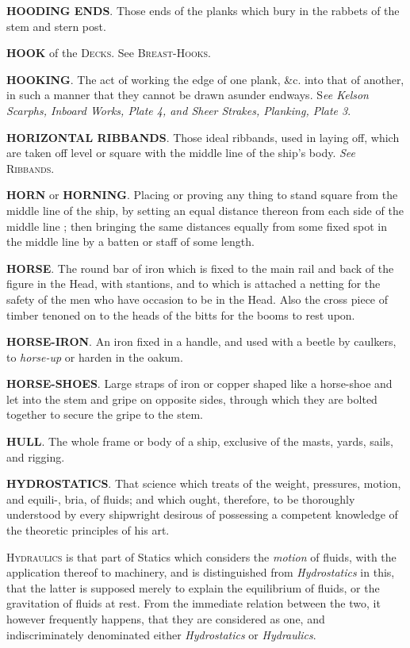 \textbf{HOODING ENDS}. Those ends of the planks which bury in the rabbets of the stem and stern post. 

\textbf{HOOK} of the \textsc{Decks}. See \textsc{Breast-Hooks}. 

\textbf{HOOKING}. The act of working the edge of one plank, \&c. into that of another, in such a manner that they cannot be drawn asunder endways. S\textit{ee Kelson Scarphs, Inboard Works, Plate 4, and Sheer Strakes, Planking, Plate 3}. 

\textbf{HORIZONTAL RIBBANDS}. Those ideal ribbands, used in laying off, which are taken off level or square with the middle line of the ship's body. \textit{See} \textsc{Ribbands}. 

\textbf{HORN} or \textbf{HORNING}. Placing or proving any thing to stand square from the middle line of the ship, by setting an equal distance thereon from each side of the middle line ; then bringing the same distances equally from some fixed spot in the middle line by a batten or staff of some length. 

\textbf{HORSE}. The round bar of iron which is fixed to the main rail and back of the figure in the Head, with stantions, and to which is attached a netting for the safety of the men who have occasion to be in the Head. Also the cross piece of timber tenoned on to the heads of the bitts for the booms to rest upon. 

\textbf{HORSE-IRON}. An iron fixed in a handle, and used with a beetle by caulkers, to \textit{horse-up} or harden in the oakum. 

\textbf{HORSE-SHOES}. Large straps of iron or copper shaped like a horse-shoe and let into the stem and gripe on opposite sides, through which they are bolted together to secure the gripe to the stem. 

\textbf{HULL}. The whole frame or body of a ship, exclusive of the masts, yards, sails, and rigging. 

\textbf{HYDROSTATICS}. That science which treats of the weight, pressures, motion, and equili-, bria, of fluids; and which ought, therefore, to be thoroughly understood by every shipwright desirous of possessing a competent knowledge of the theoretic principles of his art. 

\textsc{Hydraulics} is that part of Statics which considers the \textit{motion} of fluids, with the application thereof to machinery, and is distinguished from \textit{Hydrostatics} in this, that the latter is supposed merely to explain the equilibrium of fluids, or the gravitation of fluids at rest. From the immediate relation between the two, it however frequently happens, that they are considered as one, and indiscriminately denominated either \textit{Hydrostatics} or \textit{Hydraulics}. 

